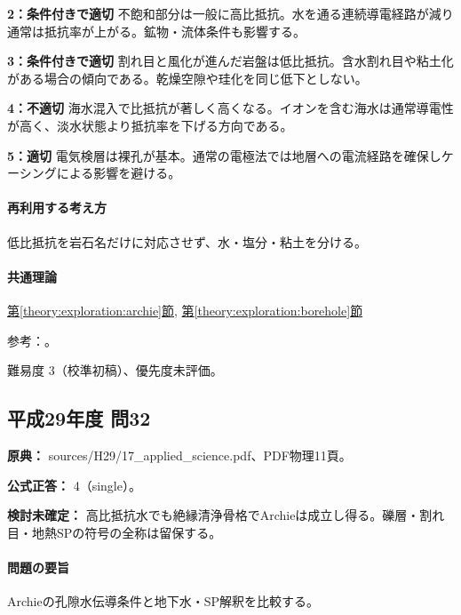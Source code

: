 \noindent\textbf{2：条件付きで適切} 不飽和部分は一般に高比抵抗。水を通る連続導電経路が減り通常は抵抗率が上がる。鉱物・流体条件も影響する。\par

\noindent\textbf{3：条件付きで適切} 割れ目と風化が進んだ岩盤は低比抵抗。含水割れ目や粘土化がある場合の傾向である。乾燥空隙や珪化を同じ低下としない。\par

\noindent\textbf{4：不適切} 海水混入で比抵抗が著しく高くなる。イオンを含む海水は通常導電性が高く、淡水状態より抵抗率を下げる方向である。\par

\noindent\textbf{5：適切} 電気検層は裸孔が基本。通常の電極法では地層への電流経路を確保しケーシングによる影響を避ける。\par

\paragraph{再利用する考え方} 低比抵抗を岩石名だけに対応させず、水・塩分・粘土を分ける。

\paragraph{共通理論} \hyperref[theory:exploration:archie]{第\ref*{theory:exploration:archie}節}, \hyperref[theory:exploration:borehole]{第\ref*{theory:exploration:borehole}節}

\par 参考：\cite{epa_resistivity,epa_borehole_resistivity}。

\par 難易度 3（校準初稿）、優先度未評価。

\subsection{平成29年度 問32}
\label{q:h29-reg-applied-32}

\noindent\textbf{原典：} sources/H29/17\_applied\_science.pdf、PDF物理11頁。

\textbf{公式正答：} 4（single）。

\par\textbf{検討未確定：} 高比抵抗水でも絶縁清浄骨格でArchieは成立し得る。礫層・割れ目・地熱SPの符号の全称は留保する。

\paragraph{問題の要旨} Archieの孔隙水伝導条件と地下水・SP解釈を比較する。

